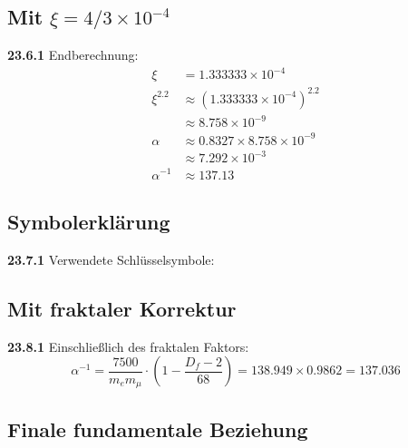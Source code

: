 \subsection{Mit $\xi = 4/3 \times 10^{-4}$}
\noindent \textbf{23.6.1} Endberechnung:
\begin{align}
	\xi &= 1.333333 \times 10^{-4} \\
	\xi^{2.2} &\approx (1.333333 \times 10^{-4})^{2.2} \\
	&\approx 8.758 \times 10^{-9} \\
	\alpha &\approx 0.8327 \times 8.758 \times 10^{-9} \\
	&\approx 7.292 \times 10^{-3} \\
	\alpha^{-1} &\approx 137.13
\end{align}

\subsection{Symbolerklärung}

\noindent \textbf{23.7.1} Verwendete Schlüsselsymbole:


\subsection{Mit fraktaler Korrektur}

\noindent \textbf{23.8.1} Einschließlich des fraktalen Faktors:
\[
\alpha^{-1} = \frac{7500}{m_e m_\mu} \cdot \left(1 - \frac{D_f - 2}{68}\right) = 138.949 \times 0.9862 = 137.036
\]

\subsection{Finale fundamentale Beziehung}

